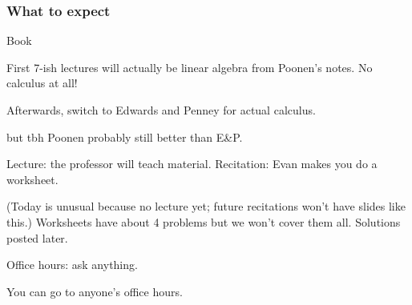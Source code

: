 \documentclass[11pt]{beamer}
\begin{document}
\begin{frame}
  \frametitle{What to expect}
  \begin{block}{Book}
    \begin{itemize}
      \ii First 7-ish lectures will actually be \alert{linear algebra} from Poonen's notes.
      No calculus at all!

      \ii Afterwards, switch to Edwards and Penney for actual calculus.
      \begin{itemize}
        \ii but tbh Poonen probably still better than E\&P.
      \end{itemize}
    \end{itemize}
  \end{block}

  \begin{itemize}
    \ii Lecture: the professor will teach material.
    \ii Recitation: Evan makes you do a worksheet.
    \begin{itemize}
      \ii (Today is unusual because no lecture yet;
      future recitations won't have slides like this.)
      \ii Worksheets have about 4 problems but we won't cover them all.
      \ii Solutions posted later.
    \end{itemize}
    \ii Office hours: ask anything.
    \begin{itemize}
      \ii You can go to anyone's office hours.
    \end{itemize}
  \end{itemize}
\end{frame}
\end{document}
